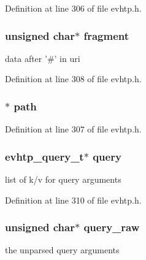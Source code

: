 Definition at line 306 of file evhtp.h.

\hypertarget{structevhtp__uri__s_a3c28c1d14341a7ab7ceb5600b7d353ae}{
\subsubsection[{fragment}]{\setlength{\rightskip}{0pt plus 5cm}unsigned char$\ast$ {\bf fragment}}}
\label{structevhtp__uri__s_a3c28c1d14341a7ab7ceb5600b7d353ae}
data after '\#' in uri 

Definition at line 308 of file evhtp.h.

\hypertarget{structevhtp__uri__s_af5dec3b872833197fa6e19e681e8a50b}{
\subsubsection[{path}]{$\ast$ {\bf path}}}
\label{structevhtp__uri__s_af5dec3b872833197fa6e19e681e8a50b}


Definition at line 307 of file evhtp.h.

\hypertarget{structevhtp__uri__s_ade25f426b13f051ad7fe2feacbcdf44e}{
\subsubsection[{query}]{\setlength{\rightskip}{0pt plus 5cm}evhtp\_\-query\_\-t$\ast$ {\bf query}}}
\label{structevhtp__uri__s_ade25f426b13f051ad7fe2feacbcdf44e}
list of k/v for query arguments 

Definition at line 310 of file evhtp.h.

\hypertarget{structevhtp__uri__s_ab78fb0297ee5380de7fe7087c2dada1b}{
\subsubsection[{query\_\-raw}]{\setlength{\rightskip}{0pt plus 5cm}unsigned char$\ast$ {\bf query\_\-raw}}}
\label{structevhtp__uri__s_ab78fb0297ee5380de7fe7087c2dada1b}
the unparsed query arguments 

